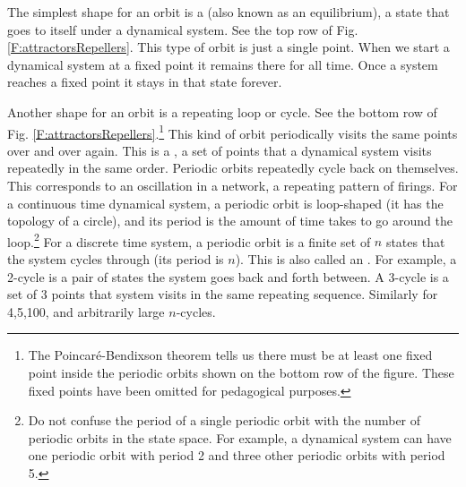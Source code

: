    The simplest shape for an orbit is a  (also known as 
an equilibrium), a state that goes to itself under a dynamical system. See the 
top row of Fig. \ref{F:attractorsRepellers}.  This type of orbit is just a 
single point.  When we start a dynamical system at a fixed point it remains 
there for all time. Once a system reaches a fixed point it stays in that state 
forever. 

   Another shape for an orbit is a repeating loop or cycle.  See the bottom row 
of Fig. \ref{F:attractorsRepellers}.\footnote{The Poincar\'{e}-Bendixson 
theorem tells us there must be at least one fixed point inside the periodic 
orbits shown on the bottom row of the figure.  These fixed points have been 
omitted for pedagogical purposes.}  This kind of orbit periodically visits the 
same points over and over again.  This is a , a set of 
points that a dynamical system visits repeatedly in the same order.  Periodic 
orbits repeatedly cycle back on themselves.  This corresponds to an oscillation 
in a network, a repeating pattern of firings.  For a continuous time dynamical 
system, a periodic orbit is loop-shaped (it has the topology of a circle), and 
its period is the amount of time takes to go around the loop.\footnote{Do not 
confuse the period of a single periodic orbit with the number of periodic 
orbits in the state space.  For example, a dynamical system can have one 
periodic orbit with period 2 and three other periodic orbits with period 5.}
For a discrete time system, a periodic orbit is a finite set of $n$ states that 
the system cycles through (its period is $n$).  This is also called an 
.  For example, a 2-cycle is a pair of states the system goes 
back and forth between.  A 3-cycle is a set of 3 points that system visits in 
the same repeating sequence.  Similarly for 4,5,100, and arbitrarily large 
$n$-cycles.  


